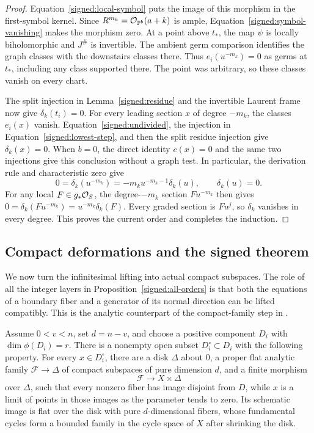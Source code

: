 \begin{proof}
Equation~\eqref{signed:local-symbol} puts the image of this
morphism in the first-symbol kernel.  Since
\(R^{m_k}=\mathcal O_{\mathbb P^b}(a+k)\) is ample,
Equation~\eqref{signed:symbol-vanishing} makes the morphism
zero.  At a point above \(t_*\), the map \(\psi\) is locally
biholomorphic and \(J^\#\) is invertible.  The ambient germ
comparison identifies the graph classes with the downstairs
classes there.  Thus \(e_i(u^{-m_k})=0\) as germs at
\(t_*\), including any class supported there.  The point was
arbitrary, so these classes vanish on every chart.

The split injection in Lemma~\ref{signed:residue} and the
invertible Laurent frame now give \(\delta_k(t_i)=0\).
For every leading section \(x\) of degree \(-m_k\), the
classes \(e_i(x)\) vanish.  Equation~\eqref{signed:undivided},
the injection in Equation~\eqref{signed:lowest-step}, and
then the split residue injection give \(\delta_k(x)=0\).
When \(b=0\), the direct identity \(c(x)=0\) and the same
two injections give this conclusion without a graph test.
In particular, the derivation rule and characteristic zero give
\[
 0=\delta_k(u^{-m_k})=-m_k u^{-m_k-1}\delta_k(u),
 \qquad \delta_k(u)=0.
\]
For any local \(F\in g_*\mathcal O_S\), the degree-\(-m_k\) section
\(Fu^{-m_k}\) then gives
\(0=\delta_k(Fu^{-m_k})=u^{-m_k}\delta_k(F)\).
Every graded section is \(Fu^j\), so \(\delta_k\) vanishes
in every degree.  This proves the current order and completes
the induction.
\end{proof}

\subsection{Compact deformations and the signed theorem}

We now turn the infinitesimal lifting into actual compact
subspaces.  The role of all the integer layers in
Proposition~\ref{signed:all-orders} is that both the equations
of a boundary fiber and a generator of its normal direction
can be lifted compatibly.  This is the analytic counterpart of
the compact-family step in \cite[Proposition~5.1]{LI}.

\begin{lemma}\label{signed:escaping-fibers}
Assume \(0<v<n\), set \(d=n-v\), and choose a positive
component \(D_i\) with \(\dim\phi(D_i)=r\).  There is a nonempty
open subset \(D_i^\circ\subset D_i\) with the following
property.  For every \(x\in D_i^\circ\), there are a disk
\(\Delta\) about \(0\), a proper flat analytic family
\(\mathscr F\to\Delta\) of compact subspaces of pure
dimension \(d\), and a finite morphism
\[
 \mathscr F\longrightarrow X\times\Delta
\]
over \(\Delta\), such that every nonzero fiber has image
disjoint from \(D\), while \(x\) is a limit of points in
those images as the parameter tends to zero.  Its schematic
image is flat over the disk with pure \(d\)-dimensional fibers,
whose fundamental cycles form a bounded family in the cycle
space of \(X\) after shrinking the disk.
\end{lemma}

